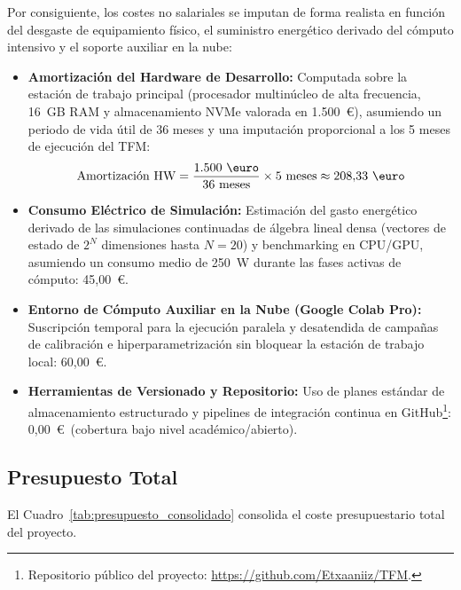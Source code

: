 Por consiguiente, los costes no salariales se imputan de forma realista en función del 
desgaste de equipamiento físico, el suministro energético derivado del cómputo intensivo 
y el soporte auxiliar en la nube:
\begin{itemize}
    \item \textbf{Amortización del Hardware de Desarrollo:} Computada sobre la estación 
          de trabajo principal (procesador multinúcleo de alta frecuencia, 16~GB RAM y 
          almacenamiento NVMe valorada en 1.500~\euro), asumiendo un periodo de vida útil 
          de 36 meses y una imputación proporcional a los 5 meses de ejecución del TFM:
          \begin{equation}
              \text{Amortización HW} = \frac{1.500\text{ \euro}}{36\text{ meses}} \times 5\text{ meses} \approx 208{,}33\text{ \euro}
          \end{equation}
    \item \textbf{Consumo Eléctrico de Simulación:} Estimación del gasto 
          energético derivado de las simulaciones continuadas de álgebra lineal densa 
          (vectores de estado de $2^N$ dimensiones hasta $N=20$) y benchmarking en CPU/GPU, 
          asumiendo un consumo medio de 250~W durante las fases activas de cómputo: 45{,}00~\euro.
    \item \textbf{Entorno de Cómputo Auxiliar en la Nube (Google Colab Pro):} Suscripción 
          temporal para la ejecución paralela y desatendida de campañas de calibración e 
          hiperparametrización sin bloquear la estación de trabajo local: 60{,}00~\euro.
    \item \textbf{Herramientas de Versionado y Repositorio:} Uso de planes estándar de 
      almacenamiento estructurado y pipelines de integración continua en GitHub\footnote{Repositorio público del proyecto: \url{https://github.com/Etxaaniiz/TFM}.}: 0{,}00~\euro\ 
      (cobertura bajo nivel académico/abierto).
\end{itemize}

\subsection{Presupuesto Total}
\label{subsec:presupuesto_consolidado}

El Cuadro~\ref{tab:presupuesto_consolidado} consolida el coste presupuestario total del 
proyecto.

